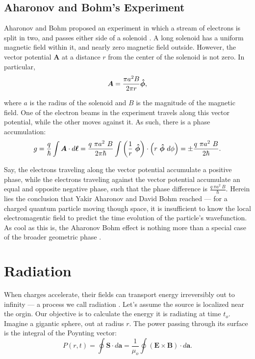 \documentclass{article}
\numberwithin{equation}{section}
\begin{document}
\subsection{Aharonov and Bohm's Experiment}

Aharonov and Bohm proposed an experiment in which a stream of electrons is split in two, and passes either side of a solenoid \cite{aharonovbohm}. A long solenoid has a uniform magnetic field within it, and nearly zero magnetic field outside. However, the vector potential $\bm{A}$ at a distance $r$ from the center of the solenoid is not zero. In particular,
\begin{equation*}
	\bm{A} = \frac{\pi a^2 B}{2\pi r} \bm{\hat{\phi}},
\end{equation*}

where $a$ is the radius of the solenoid and $B$ is the magnitude of the magnetic field. One of the electron beams in the experiment travels along this vector potential, while the other moves against it. As such, there is a phase accumulation:
\begin{equation*}
    g = \frac{q}{\hbar} \int \bm{A} \cdot d\bm{\ell} = \frac{q\ \pi a^2\ B}{2\pi\hbar} \int \left( \frac{1}{r}\ \phihat \right) \cdot \left( r\ \phihat\ d\phi \right) = \pm \frac{q\ \pi a^2\ B}{2\hbar}.
\end{equation*}

Say, the electrons traveling along the vector potential accumulate a positive phase, while the electrons traveling against the vector potential accumulate an equal and opposite negative phase, such that the phase difference is $\displaystyle \frac{q\ \pi a^2\ B}{\hbar}$. Herein lies the conclusion that Yakir Aharonov and David Bohm reached --- for a charged quantum particle moving though space, it is insufficient to know the local electromagentic field to predict the time evolution of the particle's wavefunction. As cool as this is, the Aharonov Bohm effect is nothing more than a special case of the broader geometric phase \cite{aharonovbohm}.

\section{Radiation}

When charges accelerate, their fields can transport energy irreversibly out to infinity --- a process we call radiation \cite{griffiths}. Let's assume the source is localized near the orgin. Our objective is to calculate the energy it is radiating at time $t_o$. Imagine a gigantic sphere, out at radius $r$. The power passing through its surface is the integral of the Poynting vector:
\begin{equation*}
    P(r, t) = \oint \bm{S} \cdot d\bm{a} = \frac{1}{\mu_o} \oint \left( \bm{E} \times \bm{B} \right) \cdot d\bm{a}.
\end{equation*}
\end{document}
